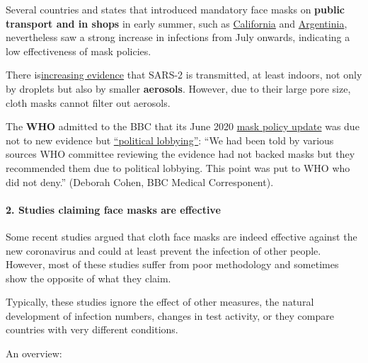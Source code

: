 Several countries and states that introduced mandatory face masks on
\textbf{public transport and in shops} in early summer, such as
\href{https://covidusa.net/?state=California}{California} and
\href{https://www.worldometers.info/coronavirus/country/argentina/}{Argentinia},
nevertheless saw a strong increase in infections from July onwards,
indicating a low effectiveness of mask policies.

There
is\href{https://jamanetwork.com/journals/jama/fullarticle/2768396}{increasing
evidence} that SARS-2 is transmitted, at least indoors, not only by
droplets but also by smaller \textbf{aerosols}. However, due to their
large pore size, cloth masks cannot filter out aerosols.

The \textbf{WHO} admitted to the BBC that its June 2020
\href{https://www.webmd.com/lung/news/20200608/who-changes-stance-says-public-should-wear-masks}{mask
policy update} was due not to new evidence but
\href{https://twitter.com/ClarkeMicah/status/1282987860090593280}{``political
lobbying''}: ``We had been told by various sources WHO committee
reviewing the evidence had not backed masks but they recommended them
due to political lobbying. This point was put to WHO who did not deny.''
(Deborah Cohen, BBC Medical Corresponent).

\hypertarget{2-studies-claiming-face-masks-are-effective}{%
\paragraph{2. Studies claiming face masks are
effective}\label{2-studies-claiming-face-masks-are-effective}}

Some recent studies argued that cloth face masks are indeed effective
against the new coronavirus and could at least prevent the infection of
other people. However, most of these studies suffer from poor
methodology and sometimes show the opposite of what they claim.

Typically, these studies ignore the effect of other measures, the
natural development of infection numbers, changes in test activity, or
they compare countries with very different conditions.

An overview:

